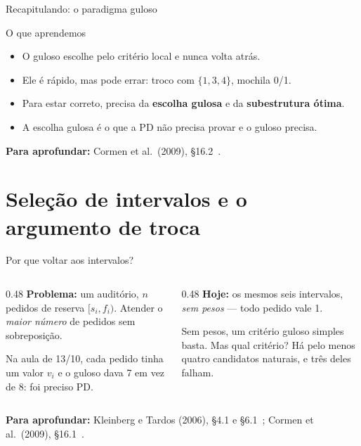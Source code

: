 \documentclass[aspectratio=169,xcolor=table]{beamer}
\newcommand{\fonte}[1]{%
  \vfill
  {\tiny\color{gray!55!black}\textbf{Para aprofundar:} #1\par}%
}
\begin{document}
\begin{frame}{Recapitulando: o paradigma guloso}
  \begin{block}{O que aprendemos}
    \begin{itemize}
      \item O guloso escolhe pelo critério local e nunca volta atrás.
      \item Ele é rápido, mas pode errar: troco com $\{1,3,4\}$, mochila 0/1.
      \item Para estar correto, precisa da \textbf{escolha gulosa} e da
            \textbf{subestrutura ótima}.
      \item A escolha gulosa é o que a PD não precisa provar e o guloso precisa.
    \end{itemize}
  \end{block}
  \fonte{Cormen et al.\ (2009), \S 16.2~\cite{cormen2009introduction}.}
\end{frame}

\section{Seleção de intervalos e o argumento de troca}

\begin{frame}{Por que voltar aos intervalos?}
  \begin{columns}[T]
    \begin{column}{0.48\textwidth}
      \textbf{Problema:} um auditório, $n$ pedidos de reserva $[s_i, f_i)$. Atender o
      \emph{maior número} de pedidos sem sobreposição.
      \medskip

      {\small Na aula de 13/10, cada pedido tinha um valor $v_i$ e o guloso dava 7 em vez
      de 8: foi preciso PD.}
    \end{column}
    \begin{column}{0.48\textwidth}
      \textbf{Hoje:} os mesmos seis intervalos, \emph{sem pesos} --- todo pedido vale 1.
      \medskip

      {\small Sem pesos, um critério guloso simples basta. Mas qual critério? Há pelo menos
      quatro candidatos naturais, e três deles falham.}
    \end{column}
  \end{columns}
  \medskip
  \begin{center}
  \end{center}
  \fonte{Kleinberg e Tardos (2006), \S 4.1 e \S 6.1~\cite{kleinberg2006algorithm};
    Cormen et al.\ (2009), \S 16.1~\cite{cormen2009introduction}.}
\end{frame}
\end{document}
